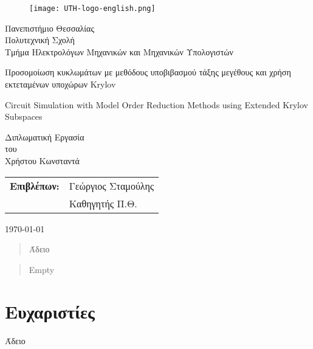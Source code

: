 \begin{titlepage}

\begin{figure}[H]
  \begin{center}
    \texttt{[image: UTH-logo-english.png]}
    \label{fig:cover_auth_logo}
  \end{center}
\end{figure}

\centering
\Large Πανεπιστήμιο Θεσσαλίας\\
\Large Πολυτεχνική Σχολή\\
\large Τμήμα Ηλεκτρολόγων Μηχανικών και Μηχανικών Υπολογιστών\\

\vspace{\fill}

\LARGE Προσομοίωση κυκλωμάτων με μεθόδους 
υποβιβασμού τάξης μεγέθους και χρήση εκτεταμένων υποχώρων 
Krylov

\vspace{\fill}

\LARGE Circuit Simulation with Model Order Reduction Methods using Extended 
Krylov Subspaces

\vspace{\fill}

\Large Διπλωματική Εργασία\\
\Large του\\
\Large Χρήστου Κωνσταντά

\vspace{\fill}
\raggedright

\begin{tabular}{ll}
\textbf{Επιβλέπων:} & Γεώργιος Σταμούλης\\
 & Καθηγητής Π.Θ.\\
\end{tabular}

\centering
\vspace{\fill}
\today

\end{titlepage}

\begin{abstract}
Άδειο
\end{abstract}

\begin{abstract}
Empty
\end{abstract}

\thispagestyle{empty}


\section*{Ευχαριστίες}
\thispagestyle{empty}

Άδειο

\clearpage
